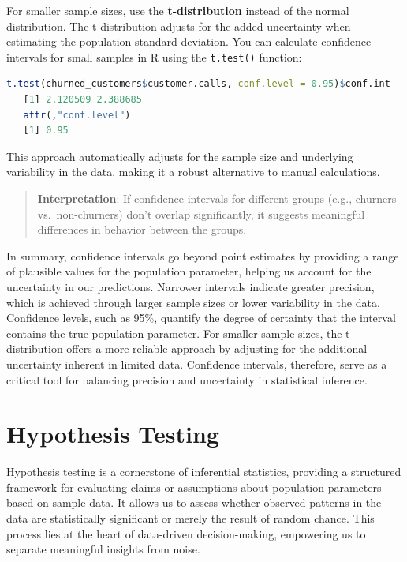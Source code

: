 \documentclass[
]{book}
\newcommand{\passthrough}[1]{#1}
\theoremstyle{definition}
\theoremstyle{definition}
\theoremstyle{definition}
\theoremstyle{definition}
\theoremstyle{remark}
\begin{document}
For smaller sample sizes, use the \textbf{t-distribution} instead of the normal distribution. The t-distribution adjusts for the added uncertainty when estimating the population standard deviation. You can calculate confidence intervals for small samples in R using the \passthrough{\lstinline!t.test()!} function:

\begin{lstlisting}[language=R]
t.test(churned_customers$customer.calls, conf.level = 0.95)$conf.int
   [1] 2.120509 2.388685
   attr(,"conf.level")
   [1] 0.95
\end{lstlisting}

This approach automatically adjusts for the sample size and underlying variability in the data, making it a robust alternative to manual calculations.

\begin{quote}
\textbf{Interpretation}: If confidence intervals for different groups (e.g., churners vs.~non-churners) don't overlap significantly, it suggests meaningful differences in behavior between the groups.
\end{quote}

In summary, confidence intervals go beyond point estimates by providing a range of plausible values for the population parameter, helping us account for the uncertainty in our predictions. Narrower intervals indicate greater precision, which is achieved through larger sample sizes or lower variability in the data. Confidence levels, such as 95\%, quantify the degree of certainty that the interval contains the true population parameter. For smaller sample sizes, the t-distribution offers a more reliable approach by adjusting for the additional uncertainty inherent in limited data. Confidence intervals, therefore, serve as a critical tool for balancing precision and uncertainty in statistical inference.

\section{Hypothesis Testing}\label{hypothesis-testing}

Hypothesis testing is a cornerstone of inferential statistics, providing a structured framework for evaluating claims or assumptions about population parameters based on sample data. It allows us to assess whether observed patterns in the data are statistically significant or merely the result of random chance. This process lies at the heart of data-driven decision-making, empowering us to separate meaningful insights from noise.
\end{document}
